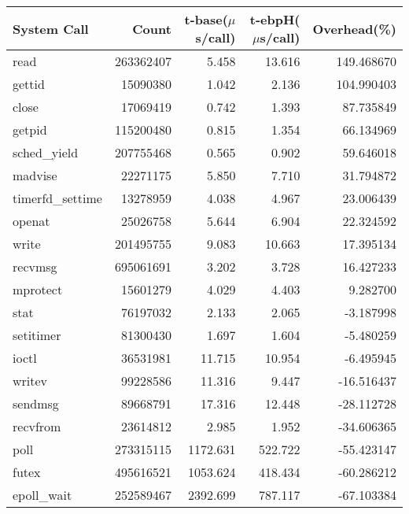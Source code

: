 \begin{tabular}{lrrrr}
\toprule
      System Call &      Count &  t-base($\mu$s/call) &  t-ebpH($\mu$s/call) &  Overhead(\%) \\
\midrule
             read &  263362407 &                5.458 &               13.616 &    149.468670 \\
           gettid &   15090380 &                1.042 &                2.136 &    104.990403 \\
            close &   17069419 &                0.742 &                1.393 &     87.735849 \\
           getpid &  115200480 &                0.815 &                1.354 &     66.134969 \\
     sched\_yield &  207755468 &                0.565 &                0.902 &     59.646018 \\
          madvise &   22271175 &                5.850 &                7.710 &     31.794872 \\
 timerfd\_settime &   13278959 &                4.038 &                4.967 &     23.006439 \\
           openat &   25026758 &                5.644 &                6.904 &     22.324592 \\
            write &  201495755 &                9.083 &               10.663 &     17.395134 \\
          recvmsg &  695061691 &                3.202 &                3.728 &     16.427233 \\
         mprotect &   15601279 &                4.029 &                4.403 &      9.282700 \\
             stat &   76197032 &                2.133 &                2.065 &     -3.187998 \\
        setitimer &   81300430 &                1.697 &                1.604 &     -5.480259 \\
            ioctl &   36531981 &               11.715 &               10.954 &     -6.495945 \\
           writev &   99228586 &               11.316 &                9.447 &    -16.516437 \\
          sendmsg &   89668791 &               17.316 &               12.448 &    -28.112728 \\
         recvfrom &   23614812 &                2.985 &                1.952 &    -34.606365 \\
             poll &  273315115 &             1172.631 &              522.722 &    -55.423147 \\
            futex &  495616521 &             1053.624 &              418.434 &    -60.286212 \\
      epoll\_wait &  252589467 &             2392.699 &              787.117 &    -67.103384 \\
\bottomrule
\end{tabular}
